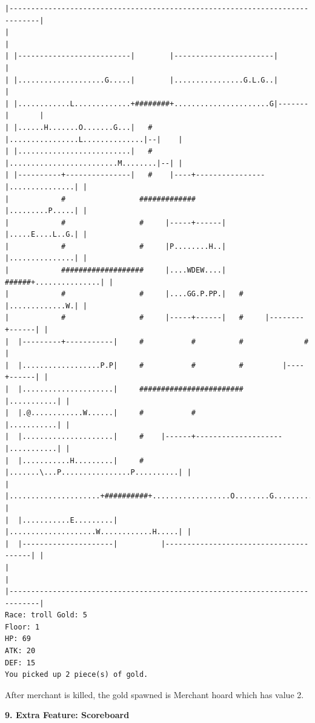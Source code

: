 \documentclass[11pt]{article}
\theoremstyle{plain}
\begin{document}
\begin{Verbatim}[fontsize=\scriptsize]
|-----------------------------------------------------------------------------|
|                                                                             |
| |--------------------------|        |-----------------------|               |
| |....................G.....|        |................G.L.G..|               |
| |............L.............+########+......................G|-------|       |
| |......H.......O.......G...|   #    |................L..............|--|    |
| |..........................|   #    |.........................M........|--| |
| |----------+---------------|   #    |----+----------------|...............| |
|            #                 #############                |.........P.....| |
|            #                 #     |-----+------|         |.....E....L..G.| |
|            #                 #     |P........H..|         |...............| |
|            ###################     |....WDEW....|   ######+...............| |
|            #                 #     |....GG.P.PP.|   #     |.............W.| |
|            #                 #     |-----+------|   #     |--------+------| |
|  |---------+-----------|     #           #          #              #        |
|  |..................P.P|     #           #          #         |----+------| |
|  |.....................|     ########################         |...........| |
|  |.@............W......|     #           #                    |...........| |
|  |.....................|     #    |------+--------------------|...........| |
|  |...........H.........|     #    |.......\...P................P..........| |
|  |.....................+##########+..................O........G...........| |
|  |...........E.........|          |....................W............H.....| |
|  |---------------------|          |---------------------------------------| |
|                                                                             |
|-----------------------------------------------------------------------------|
Race: troll Gold: 5                                                    Floor: 1
HP: 69
ATK: 20
DEF: 15
You picked up 2 piece(s) of gold. 
\end{Verbatim}

After merchant is killed, the gold spawned is Merchant hoard which has value
2.


\newpage
\textbf{9. Extra Feature: Scoreboard}
\end{document}

